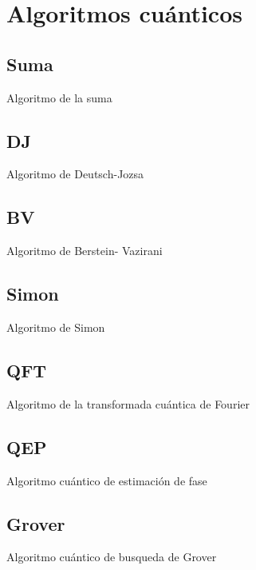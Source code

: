 \cleardoublepage

\chapter{Algoritmos cuánticos}
\label{makereference}


\section{Suma}
 Algoritmo de la suma \n

\section{DJ}
 Algoritmo de Deutsch-Jozsa \n

\section{BV}
Algoritmo de Berstein- Vazirani \n

\section{Simon}
Algoritmo de Simon \n

\section{QFT}
Algoritmo de la transformada cuántica de Fourier \n

\section{QEP}
Algoritmo cuántico de estimación de fase \n

\section{Grover}
Algoritmo cuántico de busqueda de Grover \n